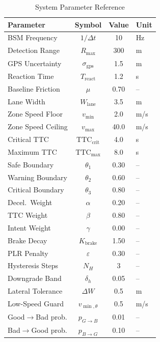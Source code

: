 \documentclass[sn-mathphys-num,Numbered,iicol]{sn-jnl}
\begin{document}
\begin{table}[htbp]
  \caption{System Parameter Reference}
  \label{tab:params}
  \renewcommand{\arraystretch}{1.15}
  \begin{tabular}{@{}lccl@{}}
    \toprule
    \textbf{Parameter} & \textbf{Symbol} & \textbf{Value} & \textbf{Unit} \\
    \midrule
    BSM Frequency       & $1/\Delta t$              & 10   & Hz  \\
    Detection Range     & $R_{\max}$                & 300  & m   \\
    GPS Uncertainty     & $\sigma_{\mathrm{gps}}$   & 1.5  & m   \\
    Reaction Time       & $T_{\mathrm{react}}$      & 1.2  & s   \\
    Baseline Friction   & $\mu$                     & 0.70 & --  \\
    Lane Width          & $W_{\mathrm{lane}}$       & 3.5  & m   \\
    Zone Speed Floor    & $v_{\min}$                & 2.0  & m/s \\
    Zone Speed Ceiling  & $v_{\max}$                & 40.0 & m/s \\
    Critical TTC        & $\mathrm{TTC}_{\mathrm{crit}}$ & 4.0 & s \\
    Maximum TTC         & $\mathrm{TTC}_{\max}$     & 8.0  & s   \\
    Safe Boundary       & $\theta_1$                & 0.30 & --  \\
    Warning Boundary    & $\theta_2$                & 0.60 & --  \\
    Critical Boundary   & $\theta_3$                & 0.80 & --  \\
    Decel.\ Weight      & $\alpha$                  & 0.20 & --  \\
    TTC Weight          & $\beta$                   & 0.80 & --  \\
    Intent Weight       & $\gamma$                  & 0.00 & --  \\
    Brake Decay         & $K_{\mathrm{brake}}$      & 1.50 & --  \\
    PLR Penalty         & $\varepsilon$             & 0.30 & --  \\
    Hysteresis Steps    & $N_H$                     & 3    & --  \\
    Downgrade Band      & $\delta_h$                & 0.05 & --  \\
    Lateral Tolerance   & $\Delta W$                & 0.5  & m   \\
    Low-Speed Guard     & $v_{\min,\theta}$         & 0.5  & m/s \\
    Good$\to$Bad prob.  & $p_{G \to B}$             & 0.01 & --  \\
    Bad$\to$Good prob.  & $p_{B \to G}$             & 0.10 & --  \\
    \bottomrule
  \end{tabular}
\end{table}
\end{document}
